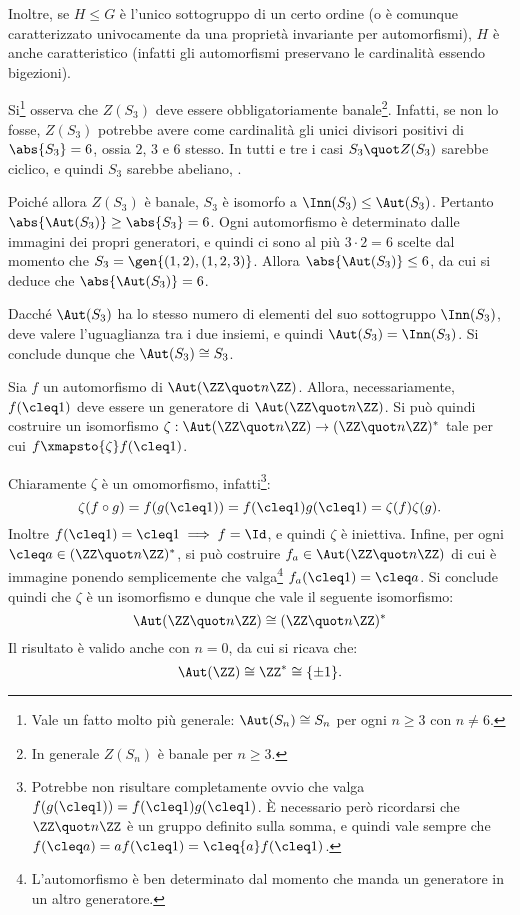 \documentclass[12pt]{scrartcl}
\begin{document}
	
	Inoltre, se $H \leq G$ è l'unico sottogruppo di un certo ordine (o è comunque
	caratterizzato univocamente da una proprietà invariante per automorfismi),
	$H$ è anche caratteristico (infatti gli automorfismi preservano le cardinalità essendo
	bigezioni). \bigskip
	
	
	\begin{example}
		Si\footnote{
			Vale un fatto molto più generale: $\Aut(S_n) \cong S_n$
			per ogni $n \geq 3$ con $n \neq 6$.
		} osserva che $Z(S_3)$ deve essere obbligatoriamente
		banale\footnote{
			In generale $Z(S_n)$ è banale per $n \geq 3$.
		}. Infatti, se non lo fosse, $Z(S_3)$ potrebbe
		avere come cardinalità gli unici divisori positivi di
		$\abs{S_3} = 6$, ossia $2$, $3$ e $6$ stesso. In tutti
		e tre i casi $S_3 \quot Z(S_3)$ sarebbe ciclico, e quindi
		$S_3$ sarebbe abeliano, \Lightning. \medskip
		
		
		Poiché allora $Z(S_3)$ è banale, $S_3$ è isomorfo a
		$\Inn(S_3) \leq \Aut(S_3)$. Pertanto $\abs{\Aut(S_3)} \geq \abs{S_3} = 6$. Ogni automorfismo è
		determinato dalle immagini dei propri generatori, e quindi
		ci sono al più $3 \cdot 2 = 6$ scelte dal momento che
		$S_3 = \gen{(1,2), (1,2,3)}$. Allora
		$\abs{\Aut(S_3)} \leq 6$, da cui si deduce che
		$\abs{\Aut(S_3)} = 6$. \medskip
		
		
		Dacché $\Aut(S_3)$ ha lo stesso numero di elementi
		del suo sottogruppo $\Inn(S_3)$, deve valere l'uguaglianza
		tra i due insiemi, e quindi $\Aut(S_3) = \Inn(S_3)$. Si
		conclude dunque che $\Aut(S_3) \cong S_3$.
	\end{example}
	
	
	\begin{example}
		Sia $f$ un automorfismo di $\Aut(\ZZ \quot n \ZZ)$. Allora,
		necessariamente, $f(\cleq1)$ deve essere un
		generatore di $\Aut(\ZZ \quot n \ZZ)$. Si può quindi costruire
		un isomorfismo $\zeta : \Aut(\ZZ \quot n \ZZ) \to
		(\ZZ \quot n \ZZ)^*$ tale per cui
		$f \xmapsto{\zeta} f(\cleq1)$. \medskip
		
		
		Chiaramente $\zeta$ è un omomorfismo, infatti\footnote{
			Potrebbe non risultare completamente ovvio che
			valga $f(g(\cleq 1)) = f(\cleq 1) g(\cleq 1)$.
			È necessario però ricordarsi che $\ZZ\quot n \ZZ$ è
			un gruppo definito sulla somma, e quindi vale sempre
			che $f(\cleq a) = a f(\cleq 1) = \cleq{a} f(\cleq 1)$.
		}:
		\[ \zeta(f \circ g) = f(g(\cleq 1)) = f(\cleq 1) g(\cleq 1) = \zeta(f) \zeta(g). \]
		Inoltre $f(\cleq 1) = \cleq 1 \implies f = \Id$, e quindi
		$\zeta$ è iniettiva. Infine, per ogni $\cleq a \in (\ZZ \quot n \ZZ)^*$, si può costruire $f_a \in \Aut(\ZZ \quot n \ZZ)$
		di cui è immagine ponendo semplicemente che valga\footnote{
			L'automorfismo è ben determinato dal momento che manda
			un generatore in un altro generatore.
		}
		$f_a(\cleq 1) = \cleq a$. Si conclude quindi che
		$\zeta$ è un isomorfismo e dunque che vale il seguente
		isomorfismo:
		\[ \Aut(\ZZ \quot n \ZZ) \cong (\ZZ \quot n \ZZ)^* \]
		Il risultato è valido anche con $n = 0$, da cui si
		ricava che:
		\[ \Aut(\ZZ) \cong \ZZ^* \cong \{\pm 1\}. \]
	\end{example}
	
\end{document}
